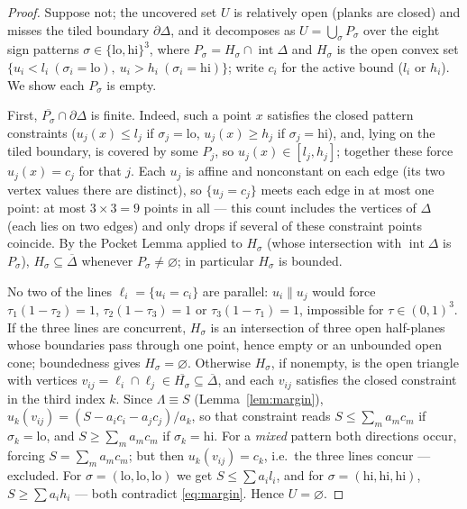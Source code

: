 \documentclass{aims}
\numberwithin{equation}{section}
\theoremstyle{plain}
\theoremstyle{definition}
\theoremstyle{remark}
\begin{document}
\begin{proof}
Suppose not; the uncovered set $U$ is
relatively open (planks are closed) and misses the tiled boundary
$\partial\Delta$, and it
decomposes as $U=\bigcup_\sigma P_\sigma$ over the eight sign patterns
$\sigma\in\{\mathrm{lo},\mathrm{hi}\}^3$, where $P_\sigma=H_\sigma\cap
\operatorname{int}\Delta$ and $H_\sigma$ is the open convex set
$\{u_i<l_i\ (\sigma_i=\mathrm{lo}),\ u_i>h_i\ (\sigma_i=\mathrm{hi})\}$; write
$c_i$ for the active bound ($l_i$ or $h_i$). We show each $P_\sigma$ is empty.

First, $\overline{P_\sigma}\cap\partial\Delta$ is finite. Indeed, such a point
$x$ satisfies the closed pattern constraints ($u_j(x)\le l_j$ if
$\sigma_j=\mathrm{lo}$, $u_j(x)\ge h_j$ if $\sigma_j=\mathrm{hi}$), and, lying
on the tiled boundary, is covered by some $P_j$, so $u_j(x)\in[l_j,h_j]$;
together these force $u_j(x)=c_j$ for that $j$. Each $u_j$ is affine and
nonconstant on each edge (its two vertex values there are distinct), so
$\{u_j=c_j\}$ meets each edge in at most one point: at most $3\times3=9$ points
in all --- this count includes the vertices of $\Delta$ (each lies on two
edges) and only drops if several of these constraint points coincide. By the
Pocket Lemma applied to $H_\sigma$ (whose intersection
with $\operatorname{int}\Delta$ is $P_\sigma$),
$H_\sigma\subseteq\overline\Delta$ whenever $P_\sigma\ne\varnothing$; in
particular $H_\sigma$ is bounded.

No two of the lines $\ell_i=\{u_i=c_i\}$ are parallel: $u_i\parallel u_j$ would
force $\tau_1(1-\tau_2)=1$, $\tau_2(1-\tau_3)=1$ or $\tau_3(1-\tau_1)=1$,
impossible for $\tau\in(0,1)^3$. If the three lines are concurrent, $H_\sigma$
is an intersection of three open half-planes whose boundaries pass through one
point, hence empty or an unbounded open cone; boundedness gives
$H_\sigma=\varnothing$. Otherwise $H_\sigma$, if nonempty, is the open triangle
with vertices $v_{ij}=\ell_i\cap\ell_j\in\overline{H_\sigma}
\subseteq\overline\Delta$, and each $v_{ij}$ satisfies the closed constraint in
the third index $k$. Since $\Lambda\equiv S$ (Lemma~\ref{lem:margin}),
$u_k(v_{ij})=(S-a_ic_i-a_jc_j)/a_k$, so that constraint reads $S\le\sum_ma_mc_m$
if $\sigma_k=\mathrm{lo}$, and $S\ge\sum_ma_mc_m$ if $\sigma_k=\mathrm{hi}$. For
a \emph{mixed} pattern both directions occur, forcing $S=\sum_ma_mc_m$; but then
$u_k(v_{ij})=c_k$, i.e.\ the three lines concur --- excluded. For
$\sigma=(\mathrm{lo},\mathrm{lo},\mathrm{lo})$ we get $S\le\sum a_il_i$, and for
$\sigma=(\mathrm{hi},\mathrm{hi},\mathrm{hi})$, $S\ge\sum a_ih_i$ --- both
contradict \eqref{eq:margin}. Hence $U=\varnothing$.
\end{proof}
\end{document}
